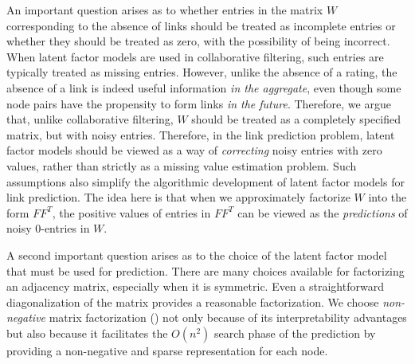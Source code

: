 

An important question arises as to whether entries in the matrix $W$
corresponding to the absence of links should be treated as incomplete
entries or whether they should be treated as zero, with the possibility
of being incorrect. When latent factor models are used in
collaborative filtering, such entries are typically treated as
missing entries. However, unlike the absence of a rating, the
absence of a link is indeed useful information {\em in the
aggregate}, even though some node pairs have the propensity to form
links {\em in the future}. Therefore, we argue that, unlike
collaborative filtering, $W$ should be treated as a completely
specified matrix, but with noisy entries. Therefore, in the link
prediction problem, latent factor models should be viewed as a way
of {\em correcting} noisy entries with zero values, rather than
strictly as a missing value estimation problem.  Such assumptions
also simplify the algorithmic development of latent factor models
for link prediction. The idea here is that when we approximately
factorize $W$ into the form  $F F^T$, the positive values of entries in
$F F^T$ can be viewed as the {\em predictions} of  noisy 0-entries in
$W$.

A second important question arises as to the choice of the latent
factor model that must be used for prediction. There are many
choices available for factorizing an adjacency matrix, especially
when it is symmetric. Even a
straightforward diagonalization of the matrix provides a reasonable
factorization. We  choose {\em non-negative} matrix factorization (\NMF)
not only because of its interpretability advantages but also because
it facilitates the  $O(n^2)$ search phase of the prediction by
providing a non-negative and sparse representation for each node.


